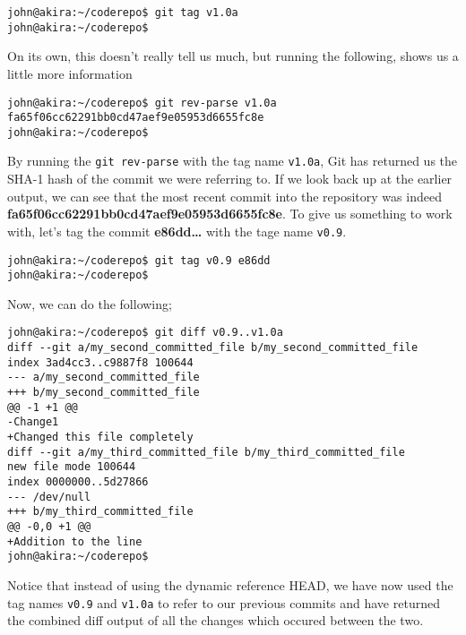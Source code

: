 \begin{Verbatim}[frame=leftline,framerule=1mm,fontsize=\relsize{-3}] 
john@akira:~/coderepo$ git tag v1.0a
john@akira:~/coderepo$ 
\end{Verbatim}

On its own, this doesn't really tell us much, but running the following, shows us a little more information

\begin{Verbatim}[frame=leftline,framerule=1mm,fontsize=\relsize{-3}] 
john@akira:~/coderepo$ git rev-parse v1.0a
fa65f06cc62291bb0cd47aef9e05953d6655fc8e
john@akira:~/coderepo$ 
\end{Verbatim}

By running the \texttt{git rev-parse} with the tag name \texttt{v1.0a}, Git has returned us the SHA-1 hash of the commit we were referring to.  If we look back up at the earlier output, we can see that the most recent commit into the repository was indeed \textbf{fa65f06cc62291bb0cd47aef9e05953d6655fc8e}.  To give us something to work with, let's tag the commit \textbf{e86dd\ldots} with the tage name \texttt{v0.9}.

\begin{Verbatim}[frame=leftline,framerule=1mm,fontsize=\relsize{-3}] 
john@akira:~/coderepo$ git tag v0.9 e86dd
john@akira:~/coderepo$ 
\end{Verbatim}

Now, we can do the following;

\begin{Verbatim}[frame=leftline,framerule=1mm,fontsize=\relsize{-3}] 
john@akira:~/coderepo$ git diff v0.9..v1.0a
diff --git a/my_second_committed_file b/my_second_committed_file
index 3ad4cc3..c9887f8 100644
--- a/my_second_committed_file
+++ b/my_second_committed_file
@@ -1 +1 @@
-Change1
+Changed this file completely
diff --git a/my_third_committed_file b/my_third_committed_file
new file mode 100644
index 0000000..5d27866
--- /dev/null
+++ b/my_third_committed_file
@@ -0,0 +1 @@
+Addition to the line
john@akira:~/coderepo$ 
\end{Verbatim}

Notice that instead of using the dynamic reference HEAD, we have now used the tag names \texttt{v0.9} and \texttt{v1.0a} to refer to our previous commits and have returned the combined diff output of all the changes which occured between the two.

